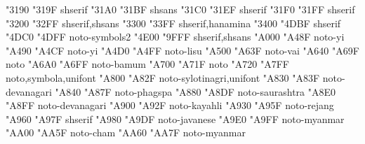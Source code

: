 \documentclass{article}
\begin{document}
                                         {  "3190} {  "319F} {shserif}
                              {  "31A0} {  "31BF} {shsans}
                                    {  "31C0} {  "31EF} {shserif}
                   {  "31F0} {  "31FF} {shserif}
                {  "3200} {  "32FF} {shserif,shsans}
                              {  "3300} {  "33FF} {shserif,hanamina}
             {  "3400} {  "4DBF} {shserif}
                        {  "4DC0} {  "4DFF} {noto-symbols2}
                         {  "4E00} {  "9FFF} {shserif,shsans}
                                   {  "A000} {  "A48F} {noto-yi}
                                    {  "A490} {  "A4CF} {noto-yi}
                                           {  "A4D0} {  "A4FF} {noto-lisu}
                                            {  "A500} {  "A63F} {noto-vai}
                            {  "A640} {  "A69F} {noto}
                                          {  "A6A0} {  "A6FF} {noto-bamum}
                          {  "A700} {  "A71F} {noto}
                               {  "A720} {  "A7FF} {noto,symbola,unifont}
                                   {  "A800} {  "A82F} {noto-sylotinagri,unifont}
                      {  "A830} {  "A83F} {noto-devanagari}
                                       {  "A840} {  "A87F} {noto-phagspa}
                                     {  "A880} {  "A8DF} {noto-saurashtra}
                            {  "A8E0} {  "A8FF} {noto-devanagari}
                                       {  "A900} {  "A92F} {noto-kayahli}
                                         {  "A930} {  "A95F} {noto-rejang}
                         {  "A960} {  "A97F} {shserif}
                                       {  "A980} {  "A9DF} {noto-javanese}
                             {  "A9E0} {  "A9FF} {noto-myanmar}
                                           {  "AA00} {  "AA5F} {noto-cham}
                             {  "AA60} {  "AA7F} {noto-myanmar}
\end{document}

